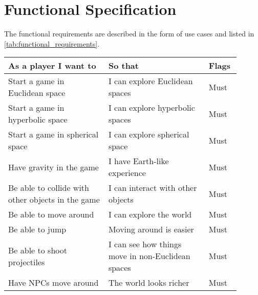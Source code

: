 \chapter{Functional Specification}\label{ch:functional_specification}
The functional requirements are described in the form of use cases and listed in \autoref{tab:functional_requirements}.

\begin{table}[!htb]
    \begin{tabular}{|p{0.4\linewidth}|p{0.4\linewidth}|p{0.1\linewidth}|}
        \hline
        \textbf{As a player I want to}                             & \textbf{So that}                                                   & \textbf{Flags} \\
        \hline
        Start a game in Euclidean space                            & I can explore Euclidean spaces                                     & Must           \\
        Start a game in hyperbolic space                           & I can explore hyperbolic spaces                                    & Must           \\
        Start a game in spherical space                            & I can explore spherical space                                      & Must           \\
        Have gravity in the game                                   & I have Earth-like experience                                       & Must           \\
        Be able to collide with other objects in the game          & I can interact with other objects                                  & Must           \\
        Be able to move around                                     & I can explore the world                                            & Must           \\
        Be able to jump                                            & Moving around is easier                                            & Must           \\
        Be able to shoot projectiles                               & I can see how things move in non-Euclidean spaces                  & Must           \\
        Have NPCs move around                                      & The world looks richer                                             & Must           \\

\end{tabular}
\end{table}
